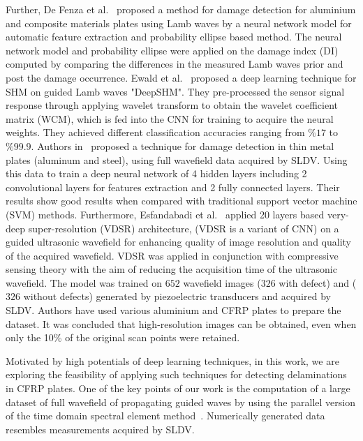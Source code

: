 \documentclass[preprint,9pt]{elsarticle}
\begin{document}
 Further, De Fenza et al.~\cite{de2015application} proposed a method for damage detection for aluminium and composite materials plates using Lamb waves by a neural network model for automatic feature extraction and probability ellipse based method. 
 The neural network model and probability ellipse were applied on the damage index (DI) computed by comparing the differences in the measured  Lamb waves prior and post the damage occurrence. 
 Ewald et al.~\cite{ewald2019deepshm} proposed a deep learning technique for SHM on guided Lamb waves "DeepSHM". 
 They pre-processed the sensor signal response through applying wavelet transform to obtain the wavelet coefficient matrix (WCM), which is fed into the CNN for training to acquire the neural weights. 
 They achieved different classification accuracies ranging from \(\%17\) to \(\%99.9\).
 Authors in~\cite{Melville2018} proposed a technique for damage detection in thin metal plates (aluminum and steel), using full wavefield data acquired by SLDV. 
 Using this data to train a deep neural network of 4 hidden layers including 2 convolutional layers for features extraction and 2 fully connected layers. 
 Their results show good results when compared with traditional support vector machine (SVM) methods.
Furthermore, Esfandabadi et al.~\cite{esfandabadideep} applied 20 layers based very-deep super-resolution (VDSR) architecture, (VDSR is a variant of CNN) on a guided ultrasonic wavefield for enhancing quality of image resolution and quality of the acquired wavefield. 
VDSR was applied in conjunction with compressive sensing theory with the aim of reducing the acquisition time of the ultrasonic wavefield.
The model was trained on \(652\) wavefield images (\(326\) with defect) and (\(326\) without defects) generated by piezoelectric transducers and acquired by SLDV. 
Authors have used various aluminium and CFRP plates to prepare the dataset.
It was concluded that high-resolution images can be obtained, even when only the 10\% of the original scan points were retained.

Motivated by high potentials of deep learning techniques, in this work, we are exploring the feasibility of applying such techniques for detecting delaminations in CFRP plates. 
One of the key points of our work is the computation of a large dataset of full wavefield of propagating guided waves by using the parallel version of the time domain spectral element method~\cite{Kudela2020}. 
Numerically generated data resembles measurements acquired by SLDV. 
	
\end{document}
